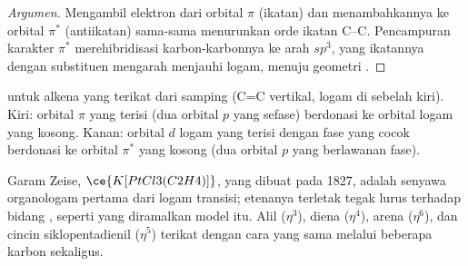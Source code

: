 \begin{proof}[Argumen]
Mengambil elektron dari orbital $\pi$ (ikatan) dan menambahkannya ke orbital $\pi^*$
(antiikatan) sama-sama menurunkan orde ikatan C--C. Pencampuran karakter $\pi^*$
merehibridisasi karbon-karbonnya ke arah $sp^3$, yang ikatannya dengan substituen mengarah menjauhi
logam, menuju geometri .
\end{proof}

\begin{omfigure}

{\small {} untuk alkena yang terikat dari samping (C=C
vertikal, logam di sebelah kiri). Kiri: orbital $\pi$ yang terisi (dua orbital $p$ yang
sefase) berdonasi ke orbital logam yang kosong. Kanan: orbital $d$ logam yang terisi
dengan fase yang cocok berdonasi ke orbital $\pi^*$ yang kosong (dua orbital $p$ yang
berlawanan fase).}
\end{omfigure}

Garam Zeise, $\ce{K[PtCl3(C2H4)]}$, yang dibuat pada 1827, adalah senyawa organologam pertama
dari logam transisi; etenanya terletak tegak lurus terhadap bidang , seperti
yang diramalkan model itu. Alil ($\eta^3$), diena ($\eta^4$), arena ($\eta^6$), dan cincin
siklopentadienil ($\eta^5$) terikat dengan cara yang sama melalui beberapa karbon sekaligus.

